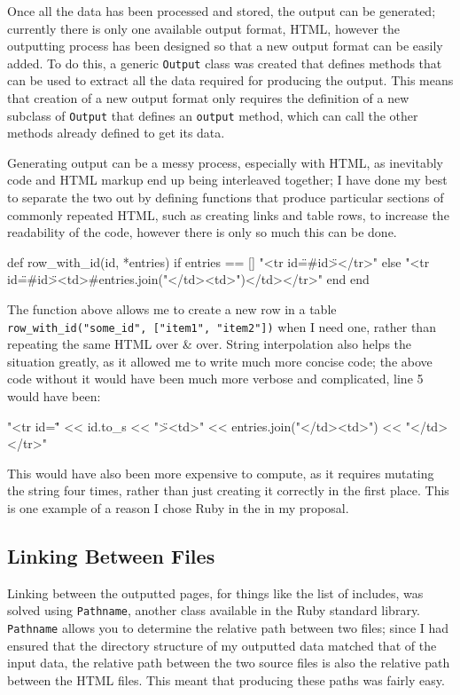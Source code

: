 Once all the data has been processed and stored, the output can be generated;
currently there is only one available output format, HTML, however the
outputting process has been designed so that a new output format can be easily
added. To do this, a generic \lstinline|Output| class was created that defines
methods that can be used to extract all the data required for producing the
output. This means that creation of a new output format only requires the
definition of a new subclass of \lstinline|Output| that defines an
\lstinline|output| method, which can call the other methods already defined to
get its data.

Generating output can be a messy process, especially with HTML, as inevitably
code and HTML markup end up being interleaved together; I have done my best to
separate the two out by defining functions that produce particular sections of
commonly repeated HTML, such as creating links and table rows, to increase the
readability of the code, however there is only so much this can be done.

\begin{code}[language=ruby, gobble=2]
  def row_with_id(id, *entries)
    if entries == []
      "<tr id=\"#{id}\"></tr>"
    else
      "<tr id=\"#{id}\"><td>#{entries.join("</td><td>")}</td></tr>\n"
    end
  end
\end{code}

The function above allows me to create a new row in a table
\lstinline|row_with_id("some_id", ["item1", "item2"])| when I need one, rather
than repeating the same HTML over \& over. String interpolation also helps the
situation greatly, as it allowed me to write much more concise code; the above
code without it would have been much more verbose and complicated, line 5 would
have been:

\begin{code}[language=ruby, gobble=2]
  "<tr id=\"" << id.to_s << "\"><td>" << entries.join("</td><td>") << "</td></tr>\n"
\end{code}

This would have also been more expensive to compute, as it requires mutating the
string four times, rather than just creating it correctly in the first place.
This is one example of a reason I chose Ruby in the in my proposal.

  \subsection{Linking Between Files}
    Linking between the outputted pages, for things like the list of includes,
    was solved using \lstinline|Pathname|, another class available in the Ruby
    standard library. \lstinline|Pathname| allows you to determine the relative
    path between two files; since I had ensured that the directory structure of
    my outputted data matched that of the input data, the relative path between
    the two source files is also the relative path between the HTML files. This
    meant that producing these paths was fairly easy.

